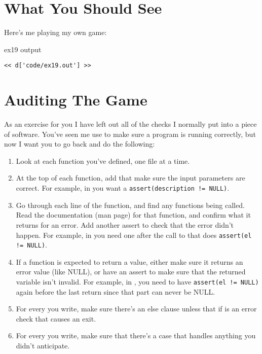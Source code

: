 \section{What You Should See}

Here's me playing my own game:

\begin{code}{ex19 output}
\begin{lstlisting}
<< d['code/ex19.out'] >>
\end{lstlisting}
\end{code}


\section{Auditing The Game}

As an exercise for you I have left out all of the  checks
I normally put into a piece of software.  You've seen me use  to
make sure a program is running correctly, but now I want you to go back
and do the following:

\begin{enumerate}
\item Look at each function you've defined, one file at a time.
\item At the top of each function, add  that make sure
    the input parameters are correct.  For example, in 
    you want a \verb|assert(description != NULL)|.
\item Go through each line of the function, and find any functions
    being called.  Read the documentation (man page) for that function,
    and confirm what it returns for an error.  Add another assert to
    check that the error didn't happen.  For example, in 
    you need one after the call to  that does \verb|assert(el != NULL)|.
\item If a function is expected to return a value, either make sure it returns
    an error value (like NULL), or have an assert to make sure that the returned
    variable isn't invalid.  For example, in , you need
    to have \verb|assert(el != NULL)| again before the last return since
    that part can never be NULL.
\item For every  you write, make sure there's an else
    clause unless that if is an error check that causes an exit.
\item For every  you write, make sure that there's
    a  case that handles anything you didn't anticipate.
\end{enumerate}

